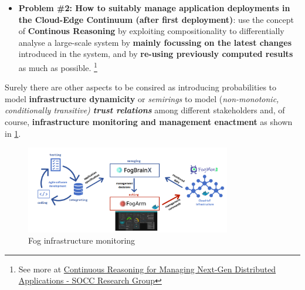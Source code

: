 \documentclass[10pt,a4paper]{report}
\begin{document}
\begin{itemize}
	\item \textbf{Problem \#2: How to suitably manage application
		deployments in the Cloud-Edge Continuum (after
		first deployment)}: use the concept of \textbf{Continous Reasoning} by exploiting compositionality to differentially analyse a large-scale system by \textbf{mainly focussing on the latest changes} introduced in the system, and by \textbf{re-using previously computed results} as much as possible. \footnote{See more at \href{https://www.youtube.com/watch?v=F7oLVrNWADA&ab_channel=di-unipi-soccresearchgroup}{Continuous Reasoning for Managing Next-Gen Distributed Applications - SOCC Research Group}}
\end{itemize}
Surely there are other aspects to be consired as introducing probabilities to model \textbf{infrastructure dynamicity} or \textit{semirings} to model (\textit{non-monotonic,
conditionally transitive) \textbf{trust relations}} among different stakeholders and, of course, \textbf{infrastructure monitoring and management enactment} as shown in \ref{image-fogArm}.

\begin{figure}[h]
	\centering
	\includegraphics[width=0.8\textwidth]{image-fogArm}
	\caption{Fog infrastructure monitoring}
	\label{image-fogArm}
\end{figure}
\end{document}
